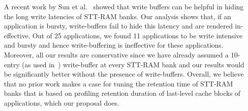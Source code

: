 A recent work by Sun et al.~\cite{gsun-hpca} showed that write buffers can be helpful in hiding the
long write latencies of STT-RAM banks. Our analysis shows that, if an application is bursty,
write-buffers fail to hide this latency and are rendered in-effective. Out of 25 applications, we
found 11 applications to be write intensive and bursty and hence write-buffering is ineffective for
these applications. Moreover, all our results are conservative since we have already assumed a
10-entry (as used in~\cite{gsun-hpca}) write-buffer at every STT-RAM bank and our results would be
significantly better without the presence of write-buffers. Overall, we believe that no prior work
makes a case for tuning the retention time of STT-RAM banks that is based on profiling retention
duration of last-level cache blocks of applications, which our proposal does.
